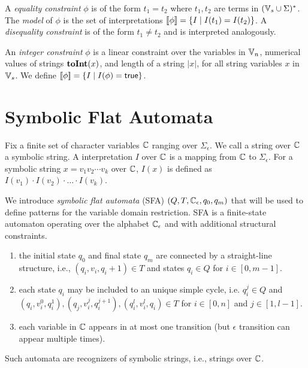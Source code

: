 \documentclass{llncs}
\begin{document}
A \emph{equality constraint} $\phi$ is of the form $t_1 = t_2$ where $t_1, 
t_2$ are terms in $(\mbox{$\mathbb{V}_s$}\cup \Sigma)^*$. The \emph{model} of $\phi$ is the set of interpretations $[\![\phi]\!]=\{I\mid 
I(t_1)=I(t_2)\}$. A \emph{disequality constraint} is of the form $t_1 \neq 
t_2$ and is interpreted analogously.

An \emph{integer constraint} $\phi$ is a linear constraint over the variables in $\mbox{$\mathbb{V}_n$}$, numerical values of strings $\mbox{\textbf{toInt}($x$)}$, and length of a string $|x|$, for all string variables $x$ in $\mbox{$\mathbb{V}_s$}$.
We define  $[\![\phi]\!]= \{I \mid I(\phi)= \mbox{$\mathsf{true}$} \}$.

\section{Symbolic Flat Automata} \label{section:sfa}

Fix a finite set of character variables $\mbox{$\mathbb{C}$}$ ranging over $\Sigma_\epsilon$.
We call a string over $\mbox{$\mathbb{C}$}$ a symbolic string.
A interpretation $I$ over $\mbox{$\mathbb{C}$}$ is a mapping from $\mbox{$\mathbb{C}$}$ to $\Sigma_\epsilon$.
For a symbolic string $x= v_1v_2\cdots v_k$ over $\mbox{$\mathbb{C}$}$, $I(x)$ is defined as $I(v_1)\cdot I(v_2)\cdot \ldots \cdot I(v_k)$.

We introduce \emph{symbolic flat automata} (SFA) $(Q,T,\mbox{$\mathbb{C}$}_\epsilon,q_0,q_m)$ that will be used to define patterns for the variable domain restriction. SFA is a finite-state automaton operating over the alphabet $\mbox{$\mathbb{C}$}_\epsilon$ and with additional structural constraints.
\begin{enumerate}
	\item the initial state $q_0$ and final state $q_m$ are connected by a straight-line structure, i.e., $(q_i,v_i,q_i+1) \in T$ and states $q_i \in Q$ for $i\in[0,m-1]$.
	\item  each state $q_i$ may be included to an unique simple cycle, i.e. $q_i^j \in Q$ and $(q_i, v_i^0, q_i^1), (q_j, v_i^j, q_i^{j+1}), (q_i^l, v_i^l, q_i) \in T$ for $i\in [0,n]$ and $j\in [1,l-1]$. 
	\item each variable in $\mbox{$\mathbb{C}$}$ appears in at most one transition (but $\epsilon$ transition can appear multiple times). 
\end{enumerate} 
Such automata are recognizers of symbolic strings, i.e., strings over $\mbox{$\mathbb{C}$}$.
\end{document}
